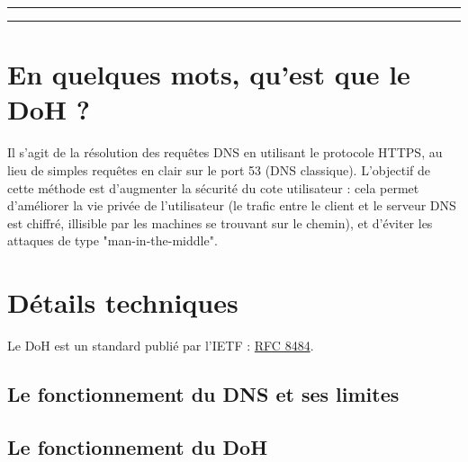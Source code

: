 \documentclass[a4paper,12pt]{article}
\begin{document}
\begin{titlepage}
		\vspace{0.1\textheight} %
		
		
		\centering
		
		\rule{\textwidth}{0.4pt} %
		
		\vspace{2pt}\vspace{-\baselineskip} %
		
		\rule{\textwidth}{1pt} %
		
	\end{titlepage}
	
	\setcounter{page}{1}
	
	\hspace{2cm}
	\tableofcontents
	
	\newpage
	
	\section{En quelques mots, qu'est que le DoH ?}
	Il s'agit de la résolution des requêtes DNS en utilisant le protocole HTTPS, au lieu de simples requêtes en clair sur le port 53 (DNS classique). L'objectif de cette méthode est d'augmenter la sécurité du cote utilisateur : cela permet d'améliorer la vie privée de l'utilisateur (le trafic entre le client et le serveur DNS est chiffré, illisible par les machines se trouvant sur le chemin), et d'éviter les attaques de type "man-in-the-middle".
	
	\section{Détails techniques}
	Le DoH est un standard publié par l'IETF : \href{https://tools.ietf.org/html/rfc8484}{RFC 8484}.
	
	\subsection{Le fonctionnement du DNS et ses limites}
	
	\subsection{Le fonctionnement du DoH}
	
\end{document}
